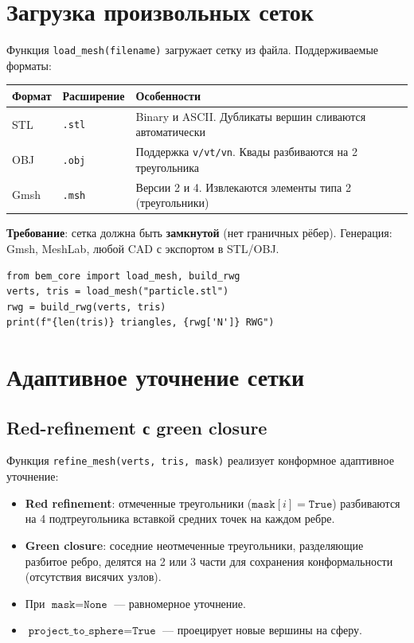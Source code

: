 \documentclass[12pt,a4paper]{article}
\begin{document}
\section{Загрузка произвольных сеток}

Функция \texttt{load\_mesh(filename)} загружает сетку из файла. Поддерживаемые форматы:

\begin{center}
\begin{tabular}{llp{7cm}}
\toprule
Формат & Расширение & Особенности \\
\midrule
STL & \texttt{.stl} & Binary и ASCII. Дубликаты вершин сливаются автоматически \\
OBJ & \texttt{.obj} & Поддержка \texttt{v/vt/vn}. Квады разбиваются на 2 треугольника \\
Gmsh & \texttt{.msh} & Версии 2 и 4. Извлекаются элементы типа 2 (треугольники) \\
\bottomrule
\end{tabular}
\end{center}

\textbf{Требование}: сетка должна быть \textbf{замкнутой} (нет граничных рёбер). Генерация: Gmsh, MeshLab, любой CAD с экспортом в STL/OBJ.

\begin{lstlisting}
from bem_core import load_mesh, build_rwg
verts, tris = load_mesh("particle.stl")
rwg = build_rwg(verts, tris)
print(f"{len(tris)} triangles, {rwg['N']} RWG")
\end{lstlisting}


\section{Адаптивное уточнение сетки}
\label{sec:adaptive}

\subsection{Red-refinement с green closure}

Функция \texttt{refine\_mesh(verts, tris, mask)} реализует конформное адаптивное уточнение:

\begin{itemize}
  \item \textbf{Red refinement}: отмеченные треугольники ($\texttt{mask}[i] = \texttt{True}$) разбиваются на 4 подтреугольника вставкой средних точек на каждом ребре.
  \item \textbf{Green closure}: соседние неотмеченные треугольники, разделяющие разбитое ребро, делятся на 2 или 3 части для сохранения конформальности (отсутствия висячих узлов).
  \item При $\texttt{mask}=\texttt{None}$ --- равномерное уточнение.
  \item $\texttt{project\_to\_sphere}=\texttt{True}$ --- проецирует новые вершины на сферу.
\end{itemize}
\end{document}
